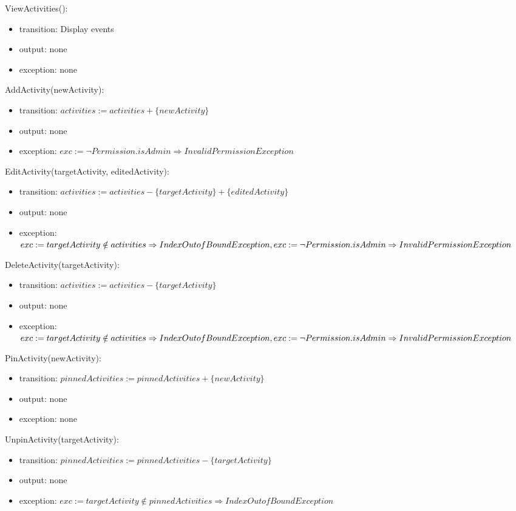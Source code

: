 \documentclass[12pt, titlepage]{article}
\begin{document}
\noindent ViewActivities():
\begin{itemize}
\item transition: Display events
\item output: none
\item exception: none
\end{itemize}

\noindent AddActivity(newActivity):
\begin{itemize}
\item transition: $activities := activities + \{newActivity\}$
\item output: none
\item exception: $exc := \neg Permission.isAdmin \Rightarrow InvalidPermission Exception$
\end{itemize}

\noindent EditActivity(targetActivity, editedActivity):
\begin{itemize}
\item transition: $activities := activities - \{targetActivity\} + \{editedActivity\}$
\item output: none
\item exception: $exc := targetActivity \notin activities \Rightarrow IndexOutofBound Exception,\\ 
                  exc := \neg Permission.isAdmin \Rightarrow InvalidPermission Exception$
\end{itemize}

\noindent DeleteActivity(targetActivity):
\begin{itemize}
\item transition: $activities := activities - \{targetActivity\}$
\item output: none
\item exception: $exc := targetActivity \notin activities \Rightarrow IndexOutofBound Exception,\\
                  exc := \neg Permission.isAdmin \Rightarrow InvalidPermission Exception$
\end{itemize}

\noindent PinActivity(newActivity):
\begin{itemize}
\item transition: $pinnedActivities := pinnedActivities + \{newActivity\}$
\item output: none
\item exception: none
\end{itemize}

\noindent UnpinActivity(targetActivity):
\begin{itemize}
\item transition: $pinnedActivities := pinnedActivities - \{targetActivity\}$
\item output: none
\item exception: $exc := targetActivity \notin pinnedActivities \Rightarrow IndexOutofBound Exception$
\end{itemize}
\end{document}
